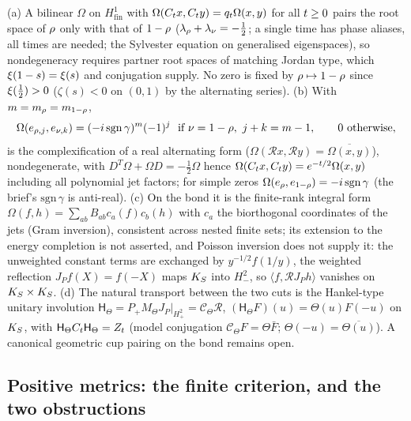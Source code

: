 \begin{theorem}
\label{thm:fe-pairing-jets}
(a) A bilinear $\Omega$ on $H^1_{\mathrm{fin}}$ with $\Omega(C_t x,C_t y) = q_t\Omega(x,y)$ for all $t\ge0$ pairs the %
root space of $\rho$ only with that of $1-\rho$ ($\lambda_\rho+\lambda_\nu = -\tfrac12$; a single time has phase aliases,
all times are needed; the Sylvester equation on generalised eigenspaces), so nondegeneracy requires partner root spaces of
matching Jordan type, which $\xi(1-s) = \xi(s)$ and conjugation supply. No zero is fixed by $\rho\mapsto1-\rho$ since
$\xi(\tfrac12)>0$ ($\zeta(s)<0$ on $(0,1)$ by the alternating series). (b) With $m = m_\rho = m_{1-\rho}$,
\[
\Omega(e_{\zero,j},e_{\nu,k}) = (-i\,\mathrm{sgn}\,\gamma)^m(-1)^j\ \text{ if }\nu = 1-\zero,\ j+k = m-1,\qquad0\text{ otherwise}, %
\]
is the complexification of a real alternating form ($\Omega(\mathcal Rx,\mathcal Ry) = \overline{\Omega(x,y)}$), nondegenerate, %
with $D^{T}\Omega+\Omega D = -\tfrac12\Omega$ hence $\Omega(C_t x,C_t y) = e^{-t/2}\Omega(x,y)$ including all polynomial %
jet factors; for simple zeros $\Omega(e_\rho,e_{1-\rho}) = -i\,\mathrm{sgn}\,\gamma$ (the brief's $\mathrm{sgn}\,\gamma$ is %
anti-real). (c) On the bond it is the finite-rank integral form $\Omega(f,h) = \sum_{ab}B_{ab}c_a(f)c_b(h)$ with $c_a$ the %
biorthogonal coordinates of the jets (Gram inversion), consistent across nested finite sets; its extension to the energy
completion is not asserted, and Poisson inversion does not supply it: the unweighted constant terms are exchanged by
$y^{-1/2}f(1/y)$, the weighted reflection $J_Pf(X) = f(-X)$ maps $K_S$ into $H^2_-$, so $\langle f,\mathcal RJ_Ph\rangle$
vanishes on $K_S\times K_S$. (d) The natural transport between the two cuts is the Hankel-type unitary involution
$\mathsf H_\Theta = P_+M_\Theta J_P|_{H^2_+} = \mathcal C_\Theta\mathcal R$, $(\mathsf H_\Theta F)(u) = \Theta(u)F(-u)$ on $K_S$,
with $\mathsf H_\Theta C_t\mathsf H_\Theta = Z_t$ (model conjugation $\mathcal C_\Theta F = \Theta\bar F$;
$\Theta(-u) = \overline{\Theta(u)}$). A canonical geometric cup pairing on the bond remains open.
\end{theorem}

\subsection{Positive metrics: the finite criterion, and the two obstructions}

